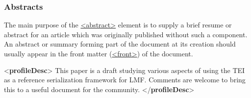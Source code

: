 \subsubsection[{Abstracts}]{Abstracts}\label{HD4ABS}\par
The main purpose of the \hyperref[TEI.abstract]{<abstract>} element is to supply a brief resume or abstract for an article which was originally published without such a component. An abstract or summary forming part of the document at its creation should usually appear in the front matter (\hyperref[TEI.front]{<front>}) of the document. \par\bgroup{}\exampleFont \begin{shaded}\noindent\mbox{}{<\textbf{profileDesc}>}\mbox{}\newline 
{}\mbox{}\newline 
\hspace*{1em}This paper is a draft studying\mbox{}\newline 
\hspace*{1em}\hspace*{1em}\hspace*{1em}\hspace*{1em} various aspects of using the TEI\mbox{}\newline 
\hspace*{1em}\hspace*{1em}\hspace*{1em}\hspace*{1em} as a reference serialization framework\mbox{}\newline 
\hspace*{1em}\hspace*{1em}\hspace*{1em}\hspace*{1em} for LMF. Comments are welcome to bring\mbox{}\newline 
\hspace*{1em}\hspace*{1em}\hspace*{1em}\hspace*{1em} this to a useful document for the\mbox{}\newline 
\hspace*{1em}\hspace*{1em}\hspace*{1em}\hspace*{1em} community.\mbox{}\newline 
\hspace*{1em}\mbox{}\newline 
{}\mbox{}\newline 
{</\textbf{profileDesc}>}\end{shaded}\egroup\par \par
